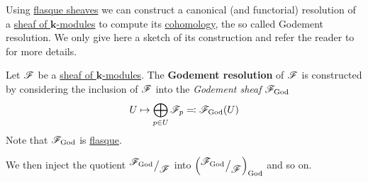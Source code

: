\documentclass[../../main]{subfiles}
\begin{document}
Using \hyperref[def:flasque-sheaf]{flasque sheaves} we can construct a canonical (and functorial) resolution of a \hyperref[def:sheaf]{sheaf of \(\mathbf{k}\)-modules} to compute its \hyperref[def:sheaf-cohomology]{cohomology}, the so called Godement resolution.
We only give here a sketch of its construction and refer the reader to \cite[\href{https://stacks.math.columbia.edu/tag/0FKR}{Section 0FKR}]{stacks-project} for more details.
\begin{construction}\label{def:godement-resolution}
  Let \(\mathscr{F}\) be a \hyperref[def:sheaf]{sheaf of \(\mathbf{k}\)-modules}.
  The \textbf{Godement resolution} of \(\mathscr{F}\) is constructed by considering the inclusion of \(\mathscr{F}\) into the \textit{Godement sheaf} \(\mathscr{F}_{\operatorname{God}}\)
  \begin{equation*}
    U \mapsto \bigoplus_{p \in U} \mathscr{F}_{p} \eqcolon \mathscr{F}_{\operatorname{God}}(U)
  \end{equation*}
  Note that \(\mathscr{F}_{\operatorname{God}}\) is \hyperref[def:flasque-sheaf]{flasque}.

  We then inject the quotient \({^{\textstyle \mathscr{F}_{\operatorname{God}}}\big/_{\textstyle \mathscr{F}}}\) into \(\left( {^{\textstyle \mathscr{F}_{\operatorname{God}}}\big/_{\textstyle \mathscr{F}}} \right)_{\operatorname{God}}\) and so on.
\end{construction}
\end{document}
